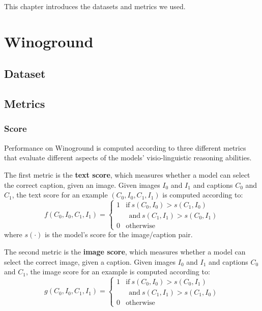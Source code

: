 This chapter introduces the datasets and metrics we used.

\section{Winoground}

\subsection{Dataset}

\subsection{Metrics}

\subsubsection{Score}

Performance on Winoground is computed according to three different metrics that evaluate different aspects of the models' visio-linguistic reasoning abilities.

The first metric is the \textbf{text score}, which measures whether a model can select the correct caption, given an image. 
Given images $I_0$ and $I_{1}$ and captions $C_{0}$ and $C_{1}$, the text score for an example $(C_{0},I_{0},C_{1},I_{1})$ is computed according to:
\begin{equation}\label{eq:text-score}
        f(C_{0},I_{0},C_{1},I_{1})= 
    \begin{cases}
        1 & \text{if}\  s(C_{0}, I_{0}) > s(C_{1}, I_{0}) \\
        & \ \ \text{and}\ s(C_{1}, I_{1}) > s(C_{0}, I_{1}) \\
        0              & \text{otherwise}
    \end{cases}
\end{equation}
where $s(\cdot)$ is the model's score for the image/caption pair.

The second metric is the \textbf{image score}, which measures whether a model can select the correct image, given a caption.
Given images $I_0$ and $I_{1}$ and captions $C_{0}$ and $C_{1}$, the image score for an example is computed according to:
\begin{equation}\label{eq:image-score}
        g(C_{0},I_{0},C_{1},I_{1})= 
    \begin{cases}
        1 & \text{if}\  s(C_{0}, I_{0}) > s(C_{0}, I_{1})\\
        & \ \ \text{and}\ s(C_{1}, I_{1}) > s(C_{1}, I_{0}) \\
        0              & \text{otherwise}
    \end{cases}
\end{equation}

